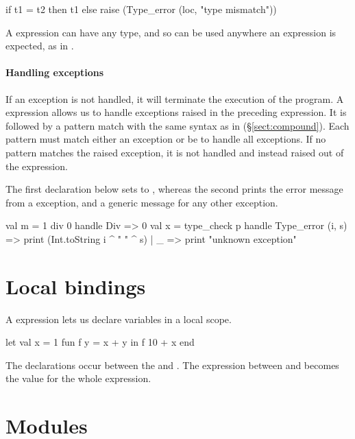 \documentclass[12pt,a4paper]{book}
\begin{document}
\begin{smlcode}
if t1 = t2 then t1
else raise (Type_error (loc, "type mismatch"))
\end{smlcode}

A  expression can have any type, and so can be used anywhere
an expression is expected, as in .

\paragraph{Handling exceptions} If an exception is not handled, it will
terminate the execution of the program.  A  expression allows
us to handle exceptions raised in the preceding expression. It is followed by a
pattern match with the same syntax as in 
(\S\ref{sect:compound}). Each pattern must match either an exception or be
\smlinline{_} to handle all exceptions. If no pattern matches the raised
exception, it is not handled and instead raised out of the 
expression.

The first declaration below sets  to , whereas the second prints
the error message from a  exception, and a generic
message for any other exception.
\begin{smlcode}
val m =
  1 div 0 handle Div => 0
val x =
  type_check p
  handle
    Type_error (i, s) => print (Int.toString i ^ " " ^ s)
  | _ => print "unknown exception"
\end{smlcode}

\section{Local bindings}

A  expression lets us declare variables in a local scope.
\begin{smlcode}
let
  val x = 1
  fun f y = x + y
in
  f 10 + x
end
\end{smlcode}
The declarations occur between the  and .
The expression between  and  becomes the value
for the whole  expression.

\section{Modules}
\label{sect:modules}
\end{document}
